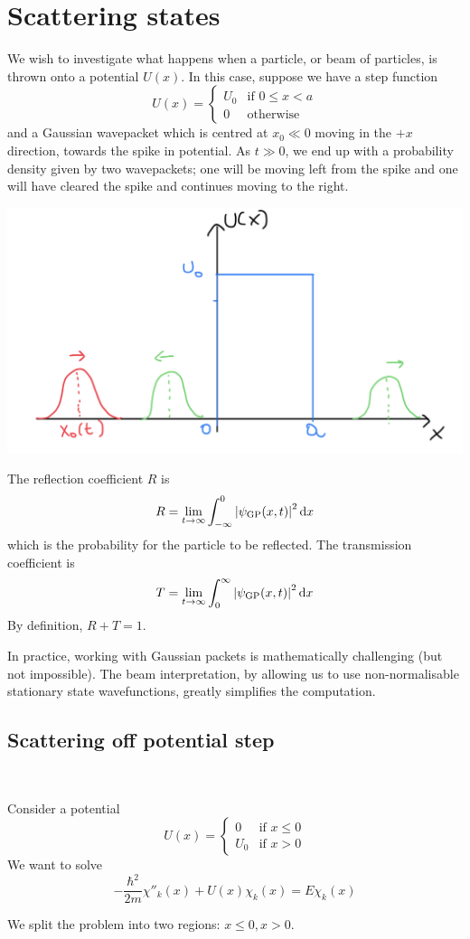 \documentclass[a4paper,11pt]{article}
\begin{document}
\section{Scattering states}
We wish to investigate what happens when a particle, or beam of particles, is thrown onto a potential \( U(x) \).
In this case, suppose we have a step function
\[
	U(x) = \begin{cases} U_0 & \text{if } 0 \leq x < a \\
              0   & \text{otherwise}\end{cases}
\]
and a Gaussian wavepacket which is centred at \( x_0 \ll 0 \) moving in the \( +x \) direction, towards the spike in potential.
As \( t \gg 0 \), we end up with a probability density given by two wavepackets; one will be moving left from the spike and one will have cleared the spike and continues moving to the right.
\begin{center}
    \includegraphics[scale=0.17]{qm10.png}
\end{center}
\begin{definition}
	The reflection coefficient \( R \) is
	\[
		R = \lim_{t \to \infty} \int_{-\infty}^0 \abs{\psi_{\text{GP}}(x,t)}^2 \dd{x}
	\]
	which is the probability for the particle to be reflected.
	The transmission coefficient is
	\[
		T = \lim_{t \to \infty} \int_0^\infty \abs{\psi_{\text{GP}}(x,t)}^2 \dd{x}
	\]
	By definition, \( R + T = 1 \).
\end{definition}
In practice, working with Gaussian packets is mathematically challenging (but not impossible).
The beam interpretation, by allowing us to use non-normalisable stationary state wavefunctions, greatly simplifies the computation.

\subsection{Scattering off potential step}\ \vspace{-1.5em}
\begin{example}
    Consider a potential
\[
	U(x) =
	\begin{cases}
		0   & \text{if } x \leq 0 \\
		U_0 & \text{if } x > 0
	\end{cases}
\]
We want to solve
\[
	-\frac{\hbar^2}{2m} \chi''_k(x) + U(x) \chi_k(x) = E\chi_k(x)
\]
\end{example}
We split the problem into two regions: \( x \leq 0, x > 0 \).
\end{document}

